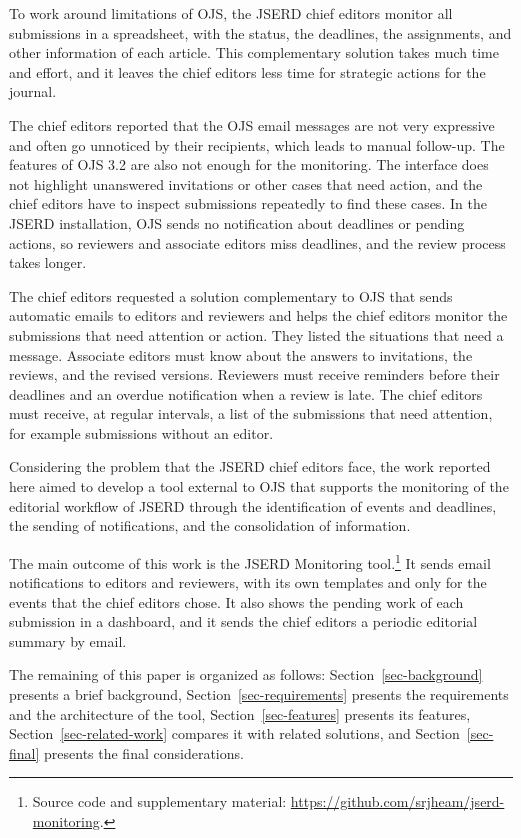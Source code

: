 \documentclass[12pt]{article}
\begin{document}
To work around limitations of OJS, the JSERD chief editors monitor all
submissions in a spreadsheet, with the status, the deadlines, the
assignments, and other information of each article. This complementary
solution takes much time and effort, and it leaves the chief editors less
time for strategic actions for the journal.

The chief editors reported that the OJS email messages are not very
expressive and often go unnoticed by their recipients, which leads to manual
follow-up. The features of OJS 3.2 are also not enough for the monitoring.
The interface does not highlight unanswered invitations or other cases that
need action, and the chief editors have to inspect submissions repeatedly to
find these cases. In the JSERD installation, OJS sends no notification about
deadlines or pending actions, so reviewers and associate editors miss
deadlines, and the review process takes longer.

The chief editors requested a solution complementary to OJS that sends
automatic emails to editors and reviewers and helps the chief editors monitor
the submissions that need attention or action. They listed the situations
that need a message. Associate editors must know about the answers to
invitations, the reviews, and the revised versions. Reviewers must receive reminders before
their deadlines and an overdue notification when a review is late. The chief
editors must receive, at regular intervals, a list of the submissions that
need attention, for example submissions without an editor.

Considering the problem that the JSERD chief editors face, the work reported
here aimed to develop a tool external to OJS that supports the monitoring of
the editorial workflow of JSERD through the identification of events and
deadlines, the sending of notifications, and the consolidation of information.

The main outcome of this work is the JSERD Monitoring
tool.\footnote{Source code and supplementary
material: \url{https://github.com/srjheam/jserd-monitoring}.} It sends email
notifications to editors and reviewers, with its own templates and only for
the events that the chief editors chose. It also shows the pending work of
each submission in a dashboard, and it sends the chief editors a periodic
editorial summary by email.

The remaining of this paper is organized as follows: Section~\ref{sec-background} presents a brief
background, Section~\ref{sec-requirements} presents the requirements and the
architecture of the tool, Section~\ref{sec-features} presents its features,
Section~\ref{sec-related-work} compares it with related solutions, and
Section~\ref{sec-final} presents the final considerations.
\end{document}
